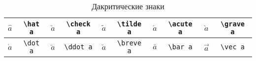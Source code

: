 \begin{table}
	\begin{tabular}{|c|c||c|c||c|c||c|c||c|c|}
		\hline $\hat a$ & \Verb|\hat a| 
		& $\check a$ & \Verb|\check a| 
		& $\tilde a$ & \Verb|\tilde a| 
		& $\acute a$ & \Verb|\acute a| 
		& $\grave a$ & \Verb|\grave a| \\
		\hline $\dot a$ & \Verb|\dot a| 
		& $\ddot a$ & \Verb|\ddot a| 
		& $\breve a$ & \Verb|\breve a| 
		& $\bar a$ & \Verb|\bar a| 
		& $\vec a$ & \Verb|\vec a| \\
		\hline
	\end{tabular}
	\caption{Дакритические знаки}
\end{table}